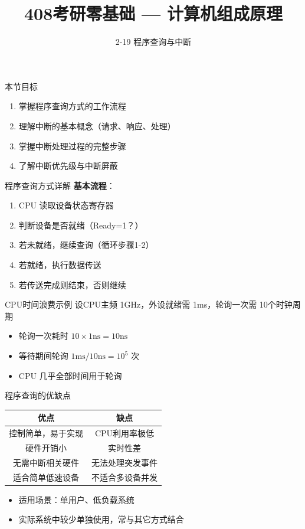 \documentclass[10pt, aspectratio=169]{beamer}
\title{408考研零基础 --- 计算机组成原理}
\subtitle{2-19 程序查询与中断}
\author{}
\date{}
\begin{document}
\begin{frame}{本节目标}
    \begin{enumerate}
        \item 掌握程序查询方式的工作流程
        \item 理解中断的基本概念（请求、响应、处理）
        \item 掌握中断处理过程的完整步骤
        \item 了解中断优先级与中断屏蔽
    \end{enumerate}
\end{frame}

\begin{frame}{程序查询方式详解}
    \textbf{基本流程}：
    \vspace{0.3em}
    \begin{enumerate}
        \item CPU 读取设备状态寄存器
        \item 判断设备是否就绪（Ready=1？）
        \item 若未就绪，继续查询（循环步骤1-2）
        \item 若就绪，执行数据传送
        \item 若传送完成则结束，否则继续
    \end{enumerate}
    \vspace{0.5em}
    \begin{block}{CPU时间浪费示例}
        设CPU主频 1GHz，外设就绪需 1ms，轮询一次需 10个时钟周期
        \begin{itemize}
            \item 轮询一次耗时 $10 \times 1\text{ns} = 10\text{ns}$
            \item 等待期间轮询 $1\text{ms} / 10\text{ns} = 10^5$ 次
            \item CPU 几乎全部时间用于轮询
        \end{itemize}
    \end{block}
\end{frame}

\begin{frame}{程序查询的优缺点}
    \begin{center}
        \begin{tabular}{|c|c|}
            \hline
            \textbf{优点} & \textbf{缺点} \\
            \hline
            控制简单，易于实现 & CPU利用率极低 \\
            硬件开销小 & 实时性差 \\
            无需中断相关硬件 & 无法处理突发事件 \\
            适合简单低速设备 & 不适合多设备并发 \\
            \hline
        \end{tabular}
    \end{center}
    \vspace{0.5em}
    \begin{itemize}
        \item 适用场景：单用户、低负载系统
        \item 实际系统中较少单独使用，常与其它方式结合
    \end{itemize}
\end{frame}
\end{document}
